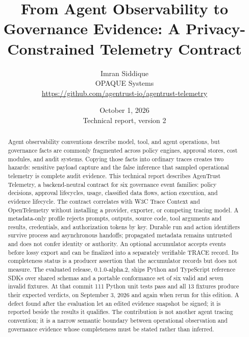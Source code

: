 \documentclass[10pt,letterpaper]{article}
\title{\textbf{From Agent Observability to Governance Evidence: A Privacy-Constrained Telemetry Contract}}
\author{
  Imran Siddique \\
  OPAQUE Systems \\[4pt]
  \normalsize \url{https://github.com/agentrust-io/agentrust-telemetry}
}
\date{October 1, 2026 \\ \small Technical report, version 2}
\begin{document}
\maketitle

\begin{abstract}
Agent observability conventions describe model, tool, and agent operations, but governance facts are commonly fragmented across policy engines, approval stores, cost modules, and audit systems. Copying those facts into ordinary traces creates two hazards: sensitive payload capture and the false inference that sampled operational telemetry is complete audit evidence. This technical report describes AgenTrust Telemetry, a backend-neutral contract for six governance event families: policy decisions, approval lifecycles, usage, classified data flows, action execution, and evidence lifecycle. The contract correlates with W3C Trace Context and OpenTelemetry without installing a provider, exporter, or competing tracing model. A metadata-only profile rejects prompts, outputs, source code, tool arguments and results, credentials, and authorization tokens by key. Durable run and action identifiers survive process and asynchronous handoffs; propagated metadata remains untrusted and does not confer identity or authority. An optional accumulator accepts events before lossy export and can be finalized into a separately verifiable TRACE record. Its completeness status is a producer assertion that the accumulator records but does not measure. The evaluated release, 0.1.0-alpha.2, ships Python and TypeScript reference SDKs over shared schemas and a portable conformance set of six valid and seven invalid fixtures. At that commit 111 Python unit tests pass and all 13 fixtures produce their expected verdicts, on September 3, 2026 and again when rerun for this edition. A defect found after the evaluation let an edited evidence snapshot be signed; it is reported beside the results it qualifies. The contribution is not another agent tracing convention; it is a narrow semantic boundary between operational observation and governance evidence whose completeness must be stated rather than inferred.
\end{abstract}
\end{document}
